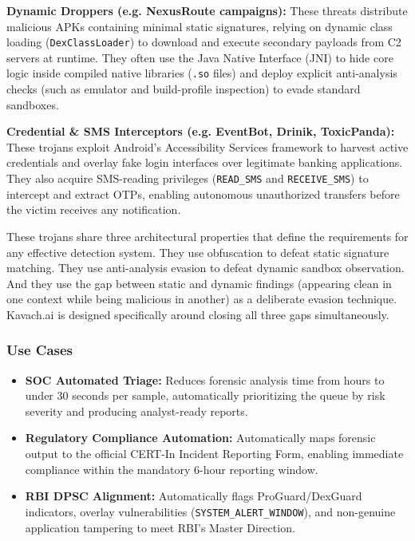 \documentclass[10pt,a4paper]{article}
\begin{document}
\textbf{Dynamic Droppers (e.g. NexusRoute campaigns):} These threats distribute malicious APKs containing minimal static signatures, relying on dynamic class loading (\texttt{DexClassLoader}) to download and execute secondary payloads from C2 servers at runtime. They often use the Java Native Interface (JNI) to hide core logic inside compiled native libraries (\texttt{.so} files) and deploy explicit anti-analysis checks (such as emulator and build-profile inspection) to evade standard sandboxes.

\textbf{Credential \& SMS Interceptors (e.g. EventBot, Drinik, ToxicPanda):} These trojans exploit Android's Accessibility Services framework to harvest active credentials and overlay fake login interfaces over legitimate banking applications. They also acquire SMS-reading privileges (\texttt{READ\_SMS} and \texttt{RECEIVE\_SMS}) to intercept and extract OTPs, enabling autonomous unauthorized transfers before the victim receives any notification.

These trojans share three architectural properties that define the requirements for any effective detection system. They use obfuscation to defeat static signature matching. They use anti-analysis evasion to defeat dynamic sandbox observation. And they use the gap between static and dynamic findings (appearing clean in one context while being malicious in another) as a deliberate evasion technique. Kavach.ai is designed specifically around closing all three gaps simultaneously.

\subsubsection*{Use Cases}

\begin{itemize}
  \item \textbf{SOC Automated Triage:} Reduces forensic analysis time from hours to under 30 seconds per sample, automatically prioritizing the queue by risk severity and producing analyst-ready reports.
  \item \textbf{Regulatory Compliance Automation:} Automatically maps forensic output to the official CERT-In Incident Reporting Form, enabling immediate compliance within the mandatory 6-hour reporting window.
  \item \textbf{RBI DPSC Alignment:} Automatically flags ProGuard/DexGuard indicators, overlay vulnerabilities (\texttt{SYSTEM\_ALERT\_WINDOW}), and non-genuine application tampering to meet RBI's Master Direction.
\end{itemize}
\end{document}
